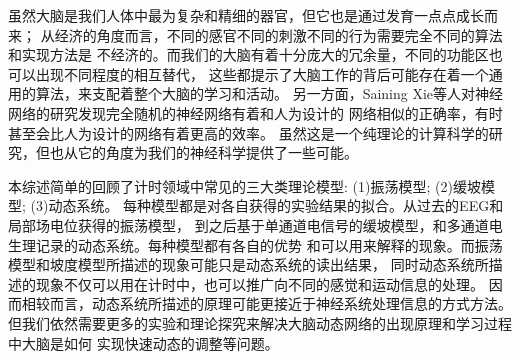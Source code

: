 
虽然大脑是我们人体中最为复杂和精细的器官，但它也是通过发育一点点成长而来；
从经济的角度而言，不同的感官不同的刺激不同的行为需要完全不同的算法和实现方法是
不经济的。而我们的大脑有着十分庞大的冗余量，不同的功能区也可以出现不同程度的相互替代，
这些都提示了大脑工作的背后可能存在着一个通用的算法，来支配着整个大脑的学习和活动。
另一方面，Saining Xie等人对神经网络的研究发现完全随机的神经网络有着和人为设计的
网络相似的正确率，有时甚至会比人为设计的网络有着更高的效率。
虽然这是一个纯理论的计算科学的研究，但也从它的角度为我们的神经科学提供了一些可能。

本综述简单的回顾了计时领域中常见的三大类理论模型: (1)振荡模型; (2)缓坡模型; (3)动态系统。
每种模型都是对各自获得的实验结果的拟合。从过去的EEG和局部场电位获得的振荡模型，
到之后基于单通道电信号的缓坡模型，和多通道电生理记录的动态系统。每种模型都有各自的优势
和可以用来解释的现象。而振荡模型和坡度模型所描述的现象可能只是动态系统的读出结果，
同时动态系统所描述的现象不仅可以用在计时中，也可以推广向不同的感觉和运动信息的处理。
因而相较而言，动态系统所描述的原理可能更接近于神经系统处理信息的方式方法。
但我们依然需要更多的实验和理论探究来解决大脑动态网络的出现原理和学习过程中大脑是如何
实现快速动态的调整等问题。

